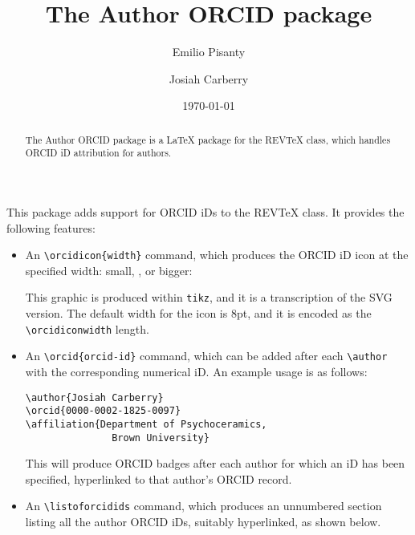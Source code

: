 \documentclass[%
  reprint,
  aps,
  pra,
  superscriptaddress,
  a4paper,
]{revtex4-2}
\begin{document}
\title{The Author ORCID package}

\author{Emilio Pisanty}

\author{Josiah Carberry}

\date{\today}

\begin{abstract}
The Author ORCID package is a {\LaTeX} package for the REVTeX class, which handles ORCID iD attribution for authors.
\end{abstract}

\maketitle


This package adds support for ORCID iDs to the REVTeX class. It provides the following features:

\begin{itemize}
\item
An \verb|\orcidicon{width}| command, which produces the ORCID iD icon at the specified width: small, \orcidicon{8pt}, or bigger:

\orcidicon{50pt}

This graphic is produced within \texttt{tikz}, and it is a transcription of the SVG version.
The default width for the icon is 8pt, and it is encoded as the \verb|\orcidiconwidth| length.

\item
An \verb|\orcid{orcid-id}| command, which can be added after each \verb|\author| with the corresponding numerical iD. 
An example usage is as follows:
\begin{verbatim}
\author{Josiah Carberry}
\orcid{0000-0002-1825-0097}
\affiliation{Department of Psychoceramics, 
               Brown University}
\end{verbatim}
This will produce ORCID badges after each author for which an iD has been specified, hyperlinked to that author's ORCID record.


\item
An \verb|\listoforcidids| command, which produces an unnumbered section listing all the author ORCID iDs, suitably hyperlinked, as shown below.

\end{itemize}
\end{document}
